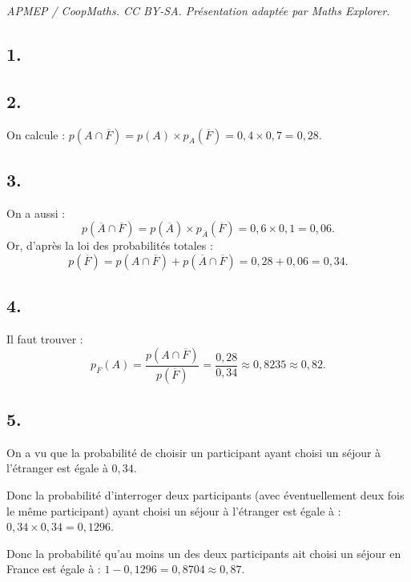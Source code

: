 \documentclass[10pt]{article}
\begin{document}
\noindent\textit{APMEP / CoopMaths. CC BY-SA. Présentation adaptée par Maths Explorer.}\par\medskip
\subsection*{1.}

\begin{center}
\end{center}

\subsection*{2.}

On calcule : \(p(A \cap \overline{F}) = p(A) \times p_A(\overline{F}) = 0{,}4 \times 0{,}7 = 0{,}28\).

\subsection*{3.}

On a aussi :
\[
p(\overline{A} \cap \overline{F}) = p(\overline{A}) \times p_{\overline{A}}(\overline{F}) = 0{,}6 \times 0{,}1 = 0{,}06.
\]
Or, d'après la loi des probabilités totales :
\[
p(\overline{F}) = p(A \cap \overline{F}) + p(\overline{A} \cap \overline{F}) = 0{,}28 + 0{,}06 = 0{,}34.
\]

\subsection*{4.}

Il faut trouver :
\[
p_{\overline{F}}(A) = \dfrac{p(A \cap \overline{F})}{p(\overline{F})} = \dfrac{0{,}28}{0{,}34} \approx 0{,}8235 \approx 0{,}82.
\]

\subsection*{5.}

On a vu que la probabilité de choisir un participant ayant choisi un séjour à l'étranger est égale à \(0{,}34\).

Donc la probabilité d'interroger deux participants (avec éventuellement deux fois le même participant) ayant choisi un séjour à l'étranger est égale à : \(0{,}34 \times 0{,}34 = 0{,}1296\).

Donc la probabilité qu'au moins un des deux participants ait choisi un séjour en France est égale à : \(1 - 0{,}1296 = 0{,}8704 \approx 0{,}87\).
\end{document}
